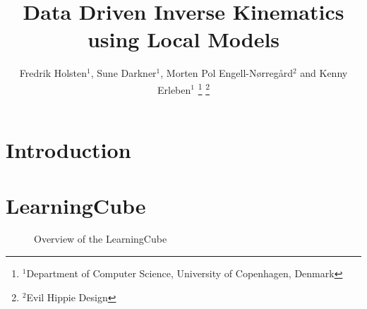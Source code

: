 \documentclass[letterpaper, 10 pt, conference]{ieeeconf}  %
\title{\LARGE \bf
Data Driven Inverse Kinematics using Local Models
}
\author{Fredrik Holsten$^{1}$, Sune Darkner$^{1}$, Morten Pol Engell-Nørregård$^{2}$ and Kenny Erleben$^{1}$%
\thanks{$^{1}$Department of Computer Science, University of Copenhagen, Denmark}%
\thanks{$^{2}$Evil Hippie Design}%
}
\begin{document}
\maketitle
\thispagestyle{empty}
\pagestyle{empty}


\begin{abstract}

\blindtext[2]

\end{abstract}



\section{Introduction}
\blindtext[5]
\clearpage

\section{LearningCube}
\blindtext[1]
\begin{figure}[htpb]
      \centering
        \caption{Overview of the LearningCube}
        \label{fig:cube}
\end{figure}
\end{document}
